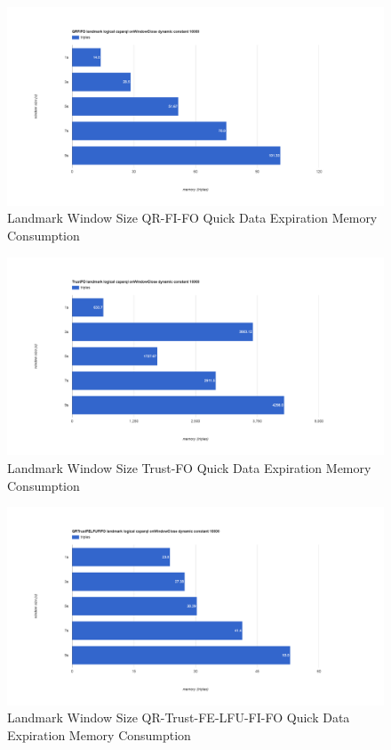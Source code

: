 \begin{figure}[!htbp]
	\centering
    \includegraphics[width=\textwidth]{img/app3-land-ws-qrfifo-quick-m.png}
    \caption{Landmark Window Size QR-FI-FO Quick Data Expiration Memory Consumption}
\end{figure}
\begin{figure}[!htbp]
	\centering
    \includegraphics[width=\textwidth]{img/app3-land-ws-trustfo-quick-m.png}
    \caption{Landmark Window Size Trust-FO Quick Data Expiration Memory Consumption}
\end{figure}
\begin{figure}[!htbp]
	\centering
    \includegraphics[width=\textwidth]{img/app3-land-ws-qrtrustfelfufifo-quick-m.png}
    \caption{Landmark Window Size QR-Trust-FE-LFU-FI-FO Quick Data Expiration Memory Consumption}
\end{figure}
